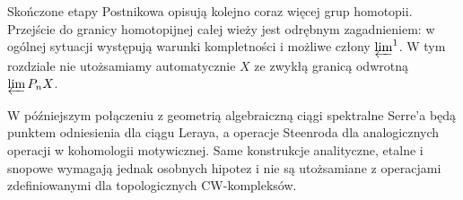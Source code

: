 \begin{uwaga}
Skończone etapy Postnikowa opisują kolejno coraz
więcej grup homotopii. Przejście do granicy
homotopijnej całej wieży jest odrębnym zagadnieniem:
w ogólnej sytuacji występują warunki kompletności
i możliwe człony $\varprojlim^1$. W tym rozdziale
nie utożsamiamy automatycznie $X$ ze zwykłą
granicą odwrotną $\varprojlim P_nX$.
\end{uwaga}

\begin{uwaga}
W późniejszym połączeniu z geometrią algebraiczną
ciągi spektralne Serre'a będą punktem odniesienia
dla ciągu Leraya, a operacje Steenroda dla analogicznych
operacji w kohomologii motywicznej. Same
konstrukcje analityczne, etalne i snopowe wymagają
jednak osobnych hipotez i nie są utożsamiane z
operacjami zdefiniowanymi dla topologicznych
CW-kompleksów.
\end{uwaga}
